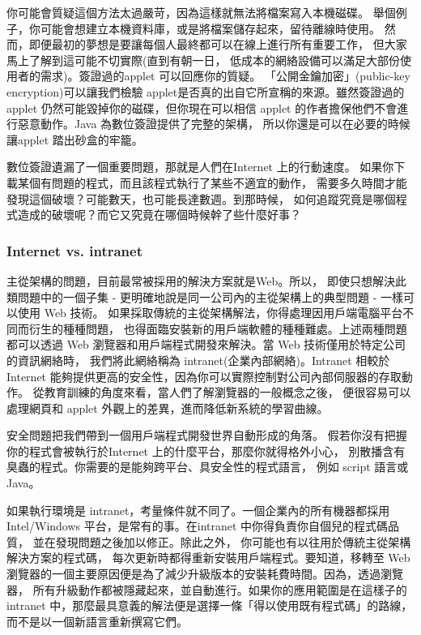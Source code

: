 你可能會質疑這個方法太過嚴苛，因為這樣就無法將檔案寫入本機磁碟。
舉個例子，你可能會想建立本機資料庫，或是將檔案儲存起來，留待離線時使用。
然而，即便最初的夢想是要讓每個人最終都可以在線上進行所有重要工作，
但大家馬上了解到這可能不切實際(直到有朝一日，
低成本的網絡設備可以滿足大部份使用者的需求)。簽證過的applet 可以回應你的質疑。
「公開金鑰加密」(public-key encryption)可以讓我們檢驗
applet是否真的出自它所宣稱的來源。雖然簽證過的
applet 仍然可能毀掉你的磁碟，但你現在可以相信
applet 的作者擔保他們不會進行惡意動作。Java 為數位簽證提供了完整的架構，
所以你還是可以在必要的時候讓applet 踏出砂盒的牢籠。

數位簽證遺漏了一個重要問題，那就是人們在Internet 上的行動速度。
如果你下載某個有問題的程式，而且該程式執行了某些不適宜的動作，
需要多久時間才能發現這個破壞？可能數天，也可能長達數週。到那時候，
如何追蹤究竟是哪個程式造成的破壞呢？而它又究竟在哪個時候幹了些什麼好事？

\subsubsection{Internet vs. intranet}
主從架構的問題，目前最常被採用的解決方案就是Web。所以，
即使只想解決此類問題中的一個子集 -
更明確地說是同一公司內的主從架構上的典型問題 - 一樣可以使用 Web 技術。
如果採取傳統的主從架構解法，你得處理因用戶端電腦平台不同而衍生的種種問題，
也得面臨安裝新的用戶端軟體的種種難處。上述兩種問題都可以透過
Web 瀏覽器和用戶端程式開發來解決。當 Web 技術僅用於特定公司的資訊網絡時，
我們將此網絡稱為 intranet(企業內部網絡)。Intranet 相較於
Internet 能夠提供更高的安全性，因為你可以實際控制對公司內部伺服器的存取動作。
從教育訓練的角度來看，當人們了解瀏覽器的一般概念之後，
便很容易可以處理網頁和 applet 外觀上的差異，進而降低新系統的學習曲線。

安全問題把我們帶到一個用戶端程式開發世界自動形成的角落。
假若你沒有把握你的程式會被執行於Internet 上的什麼平台，那麼你就得格外小心，
別散播含有臭蟲的程式。你需要的是能夠跨平台、具安全性的程式語言，
例如 script 語言或Java。

如果執行環境是 intranet，考量條件就不同了。一個企業內的所有機器都採用
Intel/Windows 平台，是常有的事。在intranet 中你得負責你自個兒的程式碼品質，
並在發現問題之後加以修正。除此之外，
你可能也有以往用於傳統主從架構解決方案的程式碼，
每次更新時都得重新安裝用戶端程式。要知道，移轉至
Web 瀏覽器的一個主要原因便是為了減少升級版本的安裝耗費時間。因為，透過瀏覽器，
所有升級動作都被隱藏起來，並自動進行。如果你的應用範圍是在這樣子的
intranet 中，那麼最具意義的解法便是選擇一條「得以使用既有程式碼」的路線，
而不是以一個新語言重新撰寫它們。

